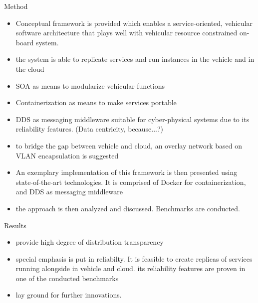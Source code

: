 Method
\begin{itemize}
\item  Conceptual framework is provided which enables a service-oriented, vehicular software architecture that plays well with vehicular resource constrained on-board system.
\item the system is able to replicate services and run instances in the vehicle and in the cloud
\item SOA as means to modularize vehicular functions 
\item Containerization as means to make services portable
\item DDS as messaging middleware suitable for cyber-physical systems due to its reliability features. (Data centricity, because...?)
\item to bridge the gap between vehicle and cloud, an overlay network based on VLAN encapsulation is suggested
\item  An exemplary implementation of this framework is then presented using state-of-the-art technologies. It is comprised of Docker for containerization, and DDS as messaging middleware
\item the approach is then analyzed and discussed. Benchmarks are conducted.
\end{itemize}


Results
\begin{itemize}
\item provide high degree of distribution transparency
\item special emphasis is put in reliabilty. It is feasible to create replicas of services running alongside in vehicle and cloud.
its reliability features are proven in one of the conducted benchmarks
\item lay ground for further innovations.
\end{itemize}
